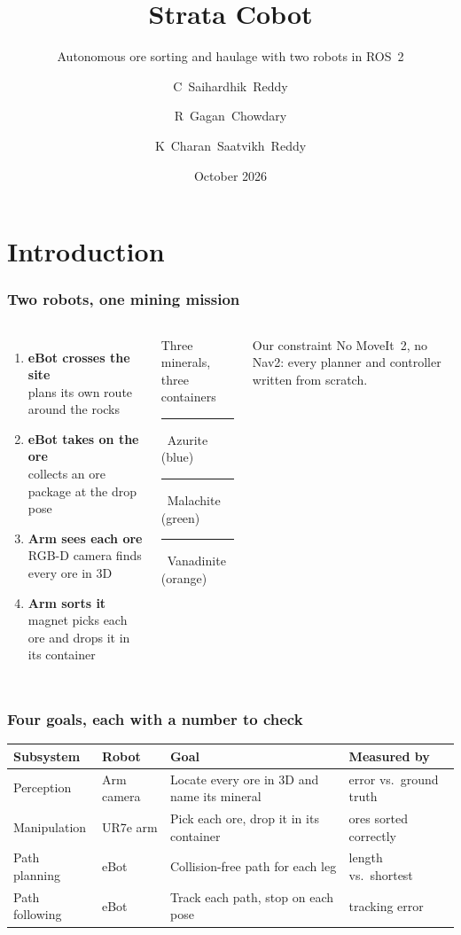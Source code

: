 \documentclass{beamer}
\title[Strata Cobot] %
{Strata Cobot}
\subtitle{Autonomous ore sorting and haulage with two robots in ROS~2}
\author[Reddy, Chowdary, Reddy] %
{C~Saihardhik~Reddy \and R~Gagan~Chowdary \and K~Charan~Saatvikh~Reddy}
\institute[Amrita] %
{
  Robotics course project\\
  Amrita Vishwa Vidyapeetham
}
\date[2026] %
{October 2026}
\begin{document}
\frame{\titlepage}

\section{Introduction}

\begin{frame}
\frametitle{Two robots, one mining mission}
\begin{columns}[T]
\begin{enumerate}
  \item \textbf{eBot crosses the site} \\ plans its own route around the rocks
  \item \textbf{eBot takes on the ore} \\ collects an ore package at the drop pose
  \item \textbf{Arm sees each ore} \\ RGB-D camera finds every ore in 3D
  \item \textbf{Arm sorts it} \\ magnet picks each ore and drops it in its container
\end{enumerate}
\begin{block}{Three minerals, three containers}
  \textcolor{azurite}{\rule{8pt}{8pt}}~Azurite (blue)\\[3pt]
  \textcolor{malachite}{\rule{8pt}{8pt}}~Malachite (green)\\[3pt]
  \textcolor{vanadinite}{\rule{8pt}{8pt}}~Vanadinite (orange)
\end{block}
\begin{alertblock}{Our constraint}
  No MoveIt~2, no Nav2: every planner and controller written from scratch.
\end{alertblock}
\end{columns}
\end{frame}

\begin{frame}
\frametitle{Four goals, each with a number to check}
\centering
\small
\begin{tabular}{@{}L{0.2\textwidth}L{0.14\textwidth}L{0.36\textwidth}L{0.22\textwidth}@{}}
\toprule
\textbf{Subsystem} & \textbf{Robot} & \textbf{Goal} & \textbf{Measured by} \\
\midrule
Perception & Arm camera & Locate every ore in 3D and name its mineral & error vs.\ ground truth \\
Manipulation & UR7e arm & Pick each ore, drop it in its container & ores sorted correctly \\
Path planning & eBot & Collision-free path for each leg & length vs.\ shortest \\
Path following & eBot & Track each path, stop on each pose & tracking error \\
\bottomrule
\end{tabular}
\end{frame}
\end{document}
